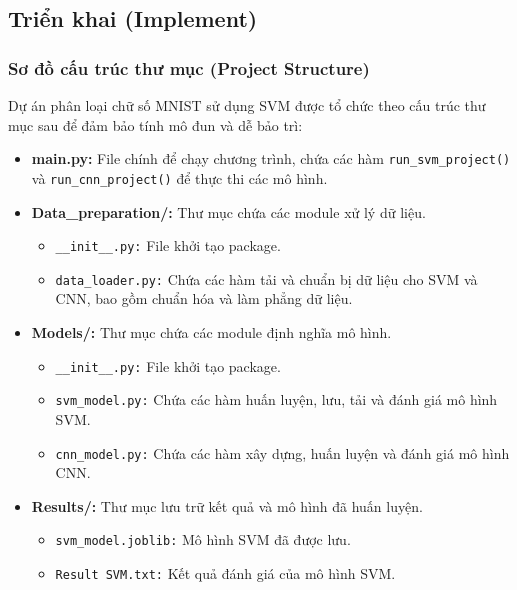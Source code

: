 \documentclass[../DoAn.tex]{subfiles}
\begin{document}
\subsection{Triển khai (Implement)}

\subsubsection{Sơ đồ cấu trúc thư mục (Project Structure)}

Dự án phân loại chữ số MNIST sử dụng SVM được tổ chức theo cấu trúc thư mục sau để đảm bảo tính mô đun và dễ bảo trì:

\begin{itemize}
    \item \textbf{main.py:} File chính để chạy chương trình, chứa các hàm \texttt{run\_svm\_project()} và \texttt{run\_cnn\_project()} để thực thi các mô hình.
    
    \item \textbf{Data\_preparation/:} Thư mục chứa các module xử lý dữ liệu.
    \begin{itemize}
        \item \texttt{\_\_init\_\_.py:} File khởi tạo package.
        \item \texttt{data\_loader.py:} Chứa các hàm tải và chuẩn bị dữ liệu cho SVM và CNN, bao gồm chuẩn hóa và làm phẳng dữ liệu.
    \end{itemize}
    
    \item \textbf{Models/:} Thư mục chứa các module định nghĩa mô hình.
    \begin{itemize}
        \item \texttt{\_\_init\_\_.py:} File khởi tạo package.
        \item \texttt{svm\_model.py:} Chứa các hàm huấn luyện, lưu, tải và đánh giá mô hình SVM.
        \item \texttt{cnn\_model.py:} Chứa các hàm xây dựng, huấn luyện và đánh giá mô hình CNN.
    \end{itemize}
    
    \item \textbf{Results/:} Thư mục lưu trữ kết quả và mô hình đã huấn luyện.
    \begin{itemize}
        \item \texttt{svm\_model.joblib:} Mô hình SVM đã được lưu.
        \item \texttt{Result SVM.txt:} Kết quả đánh giá của mô hình SVM.
    \end{itemize}
\end{itemize}
\\
\end{document}
